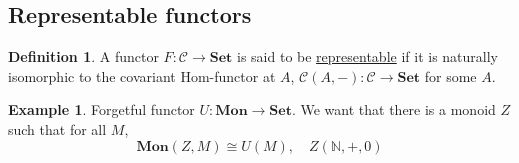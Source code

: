 \documentclass[11pt]{article} %
\theoremstyle{definition}
\newtheorem{definition}[theorem]{Definition}
\theoremstyle{definition}
\theoremstyle{definition}
\newtheorem{example}[theorem]{Example}
\begin{document}
\subsection{Representable functors}
\begin{definition}
    A functor $F:\mathcal{C}\rightarrow\textbf{Set}$ is said to be \underline{representable}
    if it is naturally isomorphic to the covariant Hom-functor at $A$,
    $\mathcal{C}(A,-):\mathcal{C}\rightarrow\textbf{Set}$ for some $A$.
\end{definition}
\begin{example}
    Forgetful functor $U:\textbf{Mon}\rightarrow\textbf{Set}$.
    We want that there is a monoid $Z$ such that for all $M$,
    \[\textbf{Mon}(Z,M) \cong U(M), \quad Z(\mathbb{N}, +, 0)\]
\end{example}
\end{document}

